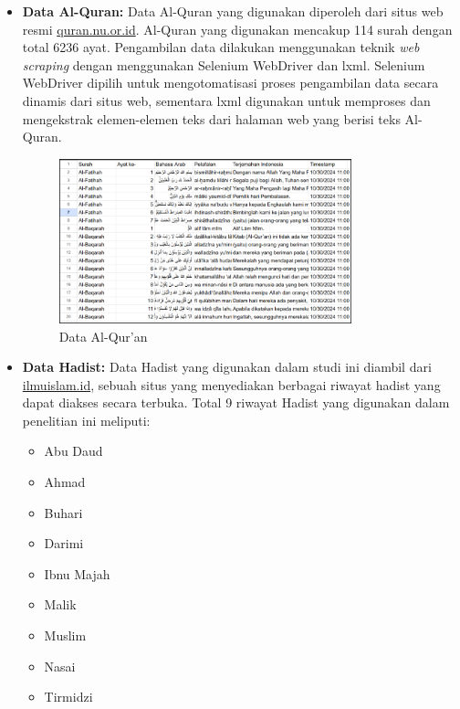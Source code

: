 \documentclass[12pt,a4paper]{article}
\begin{document}
\begin{itemize}
    \item \textbf{Data Al-Quran:} 
    Data Al-Quran yang digunakan diperoleh dari situs web resmi \href{http://quran.nu.or.id/}{quran.nu.or.id}. Al-Quran yang digunakan mencakup 114 surah dengan total 6236 ayat. Pengambilan data dilakukan menggunakan teknik \textit{web scraping} dengan menggunakan Selenium WebDriver dan lxml. Selenium WebDriver dipilih untuk mengotomatisasi proses pengambilan data secara dinamis dari situs web, sementara lxml digunakan untuk memproses dan mengekstrak elemen-elemen teks dari halaman web yang berisi teks Al-Quran.

    \begin{figure}[h!]
        \centering
        \includegraphics[width=0.8\textwidth]{images/quran.png}
        \caption{Data Al-Qur'an}
        \label{fig:quran}
    \end{figure}

    \item \textbf{Data Hadist:} 
    Data Hadist yang digunakan dalam studi ini diambil dari \href{https://ilmuislam.id/hadits/perawi/2/ahmad}{ilmuislam.id}, sebuah situs yang menyediakan berbagai riwayat hadist yang dapat diakses secara terbuka. Total 9 riwayat Hadist yang digunakan dalam penelitian ini meliputi:
    \begin{itemize}
        \item Abu Daud
        \item Ahmad
        \item Buhari
        \item Darimi
        \item Ibnu Majah
        \item Malik
        \item Muslim
        \item Nasai
        \item Tirmidzi
    \end{itemize}
    

\end{itemize}
\end{document}
